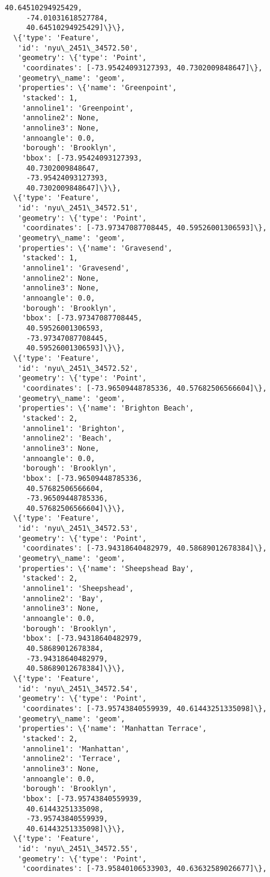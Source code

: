 \documentclass[11pt]{article}
\begin{document}
\begin{tcolorbox}[breakable, size=fbox, boxrule=.5pt, pad at break*=1mm, opacityfill=0]
\begin{Verbatim}[commandchars=\\\{\}]
     40.64510294925429,
     -74.01031618527784,
     40.64510294925429]\}\},
  \{'type': 'Feature',
   'id': 'nyu\_2451\_34572.50',
   'geometry': \{'type': 'Point',
    'coordinates': [-73.95424093127393, 40.7302009848647]\},
   'geometry\_name': 'geom',
   'properties': \{'name': 'Greenpoint',
    'stacked': 1,
    'annoline1': 'Greenpoint',
    'annoline2': None,
    'annoline3': None,
    'annoangle': 0.0,
    'borough': 'Brooklyn',
    'bbox': [-73.95424093127393,
     40.7302009848647,
     -73.95424093127393,
     40.7302009848647]\}\},
  \{'type': 'Feature',
   'id': 'nyu\_2451\_34572.51',
   'geometry': \{'type': 'Point',
    'coordinates': [-73.97347087708445, 40.59526001306593]\},
   'geometry\_name': 'geom',
   'properties': \{'name': 'Gravesend',
    'stacked': 1,
    'annoline1': 'Gravesend',
    'annoline2': None,
    'annoline3': None,
    'annoangle': 0.0,
    'borough': 'Brooklyn',
    'bbox': [-73.97347087708445,
     40.59526001306593,
     -73.97347087708445,
     40.59526001306593]\}\},
  \{'type': 'Feature',
   'id': 'nyu\_2451\_34572.52',
   'geometry': \{'type': 'Point',
    'coordinates': [-73.96509448785336, 40.57682506566604]\},
   'geometry\_name': 'geom',
   'properties': \{'name': 'Brighton Beach',
    'stacked': 2,
    'annoline1': 'Brighton',
    'annoline2': 'Beach',
    'annoline3': None,
    'annoangle': 0.0,
    'borough': 'Brooklyn',
    'bbox': [-73.96509448785336,
     40.57682506566604,
     -73.96509448785336,
     40.57682506566604]\}\},
  \{'type': 'Feature',
   'id': 'nyu\_2451\_34572.53',
   'geometry': \{'type': 'Point',
    'coordinates': [-73.94318640482979, 40.58689012678384]\},
   'geometry\_name': 'geom',
   'properties': \{'name': 'Sheepshead Bay',
    'stacked': 2,
    'annoline1': 'Sheepshead',
    'annoline2': 'Bay',
    'annoline3': None,
    'annoangle': 0.0,
    'borough': 'Brooklyn',
    'bbox': [-73.94318640482979,
     40.58689012678384,
     -73.94318640482979,
     40.58689012678384]\}\},
  \{'type': 'Feature',
   'id': 'nyu\_2451\_34572.54',
   'geometry': \{'type': 'Point',
    'coordinates': [-73.95743840559939, 40.61443251335098]\},
   'geometry\_name': 'geom',
   'properties': \{'name': 'Manhattan Terrace',
    'stacked': 2,
    'annoline1': 'Manhattan',
    'annoline2': 'Terrace',
    'annoline3': None,
    'annoangle': 0.0,
    'borough': 'Brooklyn',
    'bbox': [-73.95743840559939,
     40.61443251335098,
     -73.95743840559939,
     40.61443251335098]\}\},
  \{'type': 'Feature',
   'id': 'nyu\_2451\_34572.55',
   'geometry': \{'type': 'Point',
    'coordinates': [-73.95840106533903, 40.63632589026677]\},

\end{Verbatim}
\end{tcolorbox}
\end{document}
